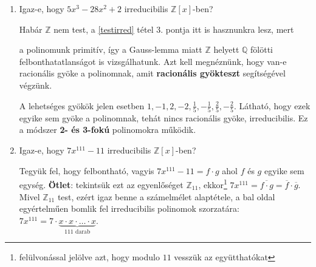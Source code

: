 \documentclass[12pt]{book}
\theoremstyle{plain} %
\theoremstyle{definition} %
\theoremstyle{remark}
\numberwithin{equation}{section}  %
\begin{document}
	\begin{enumerate}
		\item {Igaz-e, hogy $5x^3-28x^2+2$ irreducibilis $\mathbb{Z}[x]$-ben?
			
		Habár $\mathbb{Z}$ nem test, a \ref{testirred} tétel 3. pontja itt is hasznunkra lesz, mert 
		\begin{comment}
		$\mathbb{Z}$ nullosztómentes. Vagyis ha esetünkben ez a 3-fokú polinom felbomlana két polinom szorzatára, akkor azok fokszámainak összege 3 kellene legyen. Ez csak úgy lehet, ha azok fokszámai 0 és 3 vagy 1 és 2.
		
		Első esetben egy konstans kiemelhető kellene legyen a polinomból, de mivel ez nincs így, ezért a felbontásban szerepelnie kellene 1-fokú tényezőnek. Akkor viszont annak az 1-fokú tényezőnek a gyöke, az egész $5x^3-28x^2+2$ polinomnak is gyöke volna. Tehát ha be tudnánk bizonyítani, hogy ennek nincs gyöke, akkor belátnánk, hogy irreducibilis.
		
		Ez már roppant egyszerű, \textbf{racionális gyökteszt}et alkalmazunk, sőt itt elegendő nekünk csak egész gyököket keresni. A szóba jöhető lehetőségek: $1,-1,2,-2$. Ellenőrizhető, hogy ezek egyike sem gyök, irreducibilis a polinom.
		
		Ez a módszer \textbf{2- és 3-fokú} polinomokra működik. Annyi megjegyzést tennék még hozzá, hogy a hivatkozott tételt meg kellett gondolnunk $\mathbb{Z}$ esetén is, hiszen ez nem test. Mondhattuk volna azt is, hogy a polinomunk primitív, ezért $\mathbb{Z}$ helyett $\mathbb{Q}$ fölötti felbonthatatlanságot vizsgálunk, a Gauss-lemma miatt úgy is választ kapunk a kérdésre és $\mathbb{Q}$ már test. Ekkor viszont a racionális gyöktesztben valóban  
		\end{comment}
		a polinomunk primitív, így a Gauss-lemma miatt $\mathbb{Z}$ helyett $\mathbb{Q}$ fölötti felbonthatatlanságot is vizsgálhatunk. Azt kell megnéznünk, hogy van-e racionális gyöke a polinomnak, amit \textbf{racionális gyökteszt} segítségével végzünk. 
		
		A lehetséges gyökök jelen esetben $1,-1,2,-2,\frac{1}{5},-\frac{1}{5},\frac{2}{5},-\frac{2}{5}$. Látható, hogy ezek egyike sem gyöke a polinomnak, tehát nincs racionális gyöke, irreducibilis. Ez a módszer \textbf{2- és 3-fokú} polinomokra működik. 
		}
		\item{Igaz-e, hogy $7x^{111}-11$ irreducibilis $\mathbb{Z}[x]$-ben?
			
		Tegyük fel, hogy felbontható, vagyis $7x^{111}-11=f\cdot g$ ahol $f$ és $g$ egyike sem egység. \textbf{Ötlet}: tekintsük ezt az egyenlőséget $\mathbb{Z}_{11}$, ekkor\footnote{felülvonással jelölve azt, hogy modulo $11$ vesszük az együtthatókat} $7x^{111}=\overline{f\cdot g}=\overline{f}\cdot \overline{g}$. Mivel $\mathbb{Z}_{11}$ test, ezért igaz benne a számelmélet alaptétele, a bal oldal egyértelműen bomlik fel irreducibilis polinomok szorzatára: $7x^{111}=7 \cdot \underbrace{ x\cdot x \cdot \ldots \cdot x}_{111 \text{ darab}}$.
		
}
\end{enumerate}
\end{document}
